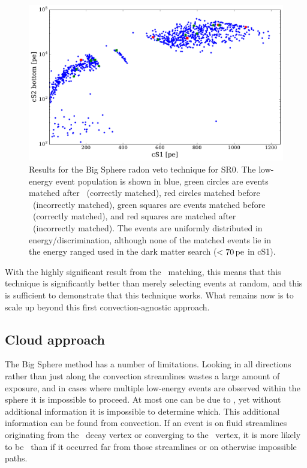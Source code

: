 \begin{figure}[htbp]
\centering
\includegraphics[width=\textwidth]{figures/rnveto/sr0_bs_results_energy}
\caption{Results for the Big Sphere radon veto technique for SR0. The low-energy event population is shown in blue, green circles are events matched after \Po~(correctly matched), red circles matched before \Po~(incorrectly matched), green squares are events matched before \BiPo~(correctly matched), and red squares are matched after \BiPo~(incorrectly matched). The events are uniformly distributed in energy/discrimination, although none of the matched events lie in the energy ranged used in the dark matter search ($<70\,\mathrm{pe}$ in cS1).}\label{fig:match_parameters1}
\end{figure}

With the highly significant result from the \Po~matching, this means that this technique is significantly better than merely selecting events at random, and this is sufficient to demonstrate that this technique works. What remains now is to scale up beyond this first convection-agnostic approach.

\subsection{Cloud approach}

The Big Sphere method has a number of limitations. Looking in all directions rather than just along the convection streamlines wastes a large amount of exposure, and in cases where multiple low-energy events are observed within the sphere it is impossible to proceed. At most one can be due to \Pb, yet without additional information it is impossible to determine which. This additional information can be found from convection. If an event is on fluid streamlines originating from the \Po~decay vertex or converging to the \BiPo~vertex, it is more likely to be \Pb~than if it occurred far from those streamlines or on otherwise impossible paths.

